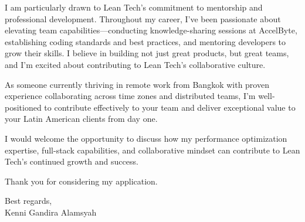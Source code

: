 \documentclass[11pt,a4paper]{article}
\begin{document}
I am particularly drawn to Lean Tech's commitment to mentorship and professional development. Throughout my career, I've been passionate about elevating team capabilities---conducting knowledge-sharing sessions at AccelByte, establishing coding standards and best practices, and mentoring developers to grow their skills. I believe in building not just great products, but great teams, and I'm excited about contributing to Lean Tech's collaborative culture.

\vspace{1em}

As someone currently thriving in remote work from Bangkok with proven experience collaborating across time zones and distributed teams, I'm well-positioned to contribute effectively to your team and deliver exceptional value to your Latin American clients from day one.

\vspace{1em}

I would welcome the opportunity to discuss how my performance optimization expertise, full-stack capabilities, and collaborative mindset can contribute to Lean Tech's continued growth and success.

\vspace{1em}

Thank you for considering my application.

\vspace{1em}

Best regards,\\
Kenni Gandira Alamsyah
\end{document}
